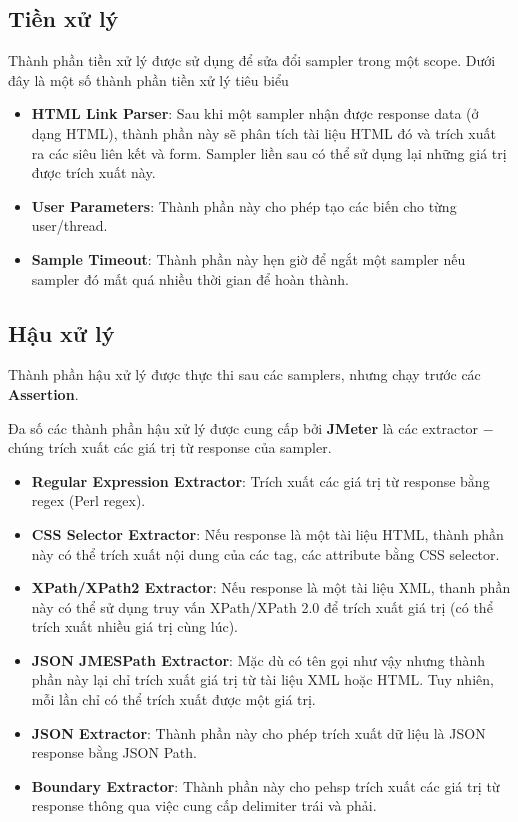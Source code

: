 \documentclass[12pt]{report}
\newcommand{\jmeter}{\textbf{JMeter}}
\begin{document}
\subsection{Tiền xử lý}

\par Thành phần tiền xử lý được sử dụng để sửa đổi sampler trong một scope. Dưới đây là một số thành phần tiền xử lý tiêu biểu

\begin{itemize}
    \item \textbf{HTML Link Parser}: Sau khi một sampler nhận được response data (ở dạng HTML), thành phần này sẽ phân tích tài liệu HTML đó và trích xuất ra các siêu liên kết và form. Sampler liền sau có thể sử dụng lại những giá trị được trích xuất này.
    \item \textbf{User Parameters}: Thành phần này cho phép tạo các biến cho từng user/thread.
    \item \textbf{Sample Timeout}: Thành phần này hẹn giờ để ngắt một sampler nếu sampler đó mất quá nhiều thời gian để hoàn thành.
\end{itemize}

\subsection{Hậu xử lý}

\par Thành phần hậu xử lý được thực thi sau các samplers, nhưng chạy trước các \textbf{Assertion}.

\par Đa số các thành phần hậu xử lý được cung cấp bởi \jmeter{} là các extractor $-$ chúng trích xuất các giá trị từ response của sampler.

\begin{itemize}
    \item \textbf{Regular Expression Extractor}: Trích xuất các giá trị từ response bằng regex (Perl regex).
    \item \textbf{CSS Selector Extractor}: Nếu response là một tài liệu HTML, thành phần này có thể trích xuất nội dung của các tag, các attribute bằng CSS selector.
    \item \textbf{XPath/XPath2 Extractor}: Nếu response là một tài liệu XML, thanh phần này có thể sử dụng truy vấn XPath/XPath 2.0 để trích xuất giá trị (có thể trích xuất nhiều giá trị cùng lúc).
    \item \textbf{JSON JMESPath Extractor}: Mặc dù có tên gọi như vậy nhưng thành phần này lại chỉ trích xuất giá trị từ tài liệu XML hoặc HTML. Tuy nhiên, mỗi lần chỉ có thể trích xuất được một giá trị.
    \item \textbf{JSON Extractor}: Thành phần này cho phép trích xuất dữ liệu là JSON response bằng JSON Path.
    \item \textbf{Boundary Extractor}: Thành phần này cho pehsp trích xuất các giá trị từ response thông qua việc cung cấp delimiter trái và phải.
\end{itemize}
\end{document}
